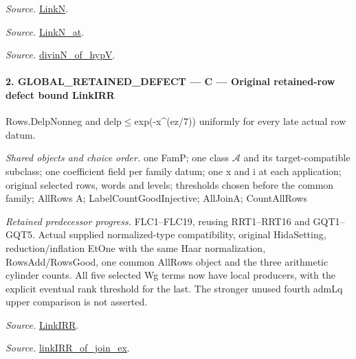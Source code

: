 \emph{Source.} \href{https://github.com/CocoSgt/riemann-hypothesis-lean/blob/7cbf7a0c32fca1badf05931879a37c3f8a2b03b4/src/Formalism/SharpRestriction/GlobalTheoremInputs.lean#L45-L48}{LinkN}.

\emph{Source.} \href{https://github.com/CocoSgt/riemann-hypothesis-lean/blob/7cbf7a0c32fca1badf05931879a37c3f8a2b03b4/src/Formalism/SharpRestriction/GlobalTheoremInputs.lean#L40-L44}{LinkN\_\allowbreak at}.

\emph{Source.} \href{https://github.com/CocoSgt/riemann-hypothesis-lean/blob/7cbf7a0c32fca1badf05931879a37c3f8a2b03b4/src/Development/AutomorphicArithmetic/CharacterBoxes/DivinNOfHypV.lean#L117-L134}{divinN\_\allowbreak of\_\allowbreak hypV}.



\paragraph{2. GLOBAL\_\allowbreak RETAINED\_\allowbreak DEFECT — C — Original retained-row defect bound LinkIRR}

Rows.DelpNonneg and delp$\le$exp(-x\textasciicircum{}(ez/7)) uniformly for every late actual row datum.

\emph{Shared objects and choice order.} one FamP; one class $\mathcal A$ and its target-compatible subclass; one coefficient field per family datum; one x and i at each application; original selected rows, words and levels; thresholds chosen before the common family; AllRows A; LabelCountGoodInjective; AllJoinA; CountAllRows

\emph{Retained predecessor progress.} FLC1–FLC19, reusing RRT1–RRT16 and GQT1–GQT5. Actual supplied normalized-type compatibility, original HidaSetting, reduction/inflation EtOne with the same Haar normalization, RowsAdd/RowsGood, one common AllRows object and the three arithmetic cylinder counts. All five selected Wg terms now have local producers, with the explicit eventual rank threshold for the last. The stronger unused fourth admLq upper comparison is not asserted.

\emph{Source.} \href{https://github.com/CocoSgt/riemann-hypothesis-lean/blob/7cbf7a0c32fca1badf05931879a37c3f8a2b03b4/src/Formalism/SharpRestriction/GlobalTheoremInputs.lean#L55-L58}{LinkIRR}.

\emph{Source.} \href{https://github.com/CocoSgt/riemann-hypothesis-lean/blob/7cbf7a0c32fca1badf05931879a37c3f8a2b03b4/src/Development/AbelianVarietyTheory/Proofs/GlobalInterpolation/LinkIRROfJoinEx.lean#L17-L38}{linkIRR\_\allowbreak of\_\allowbreak join\_\allowbreak ex}.

